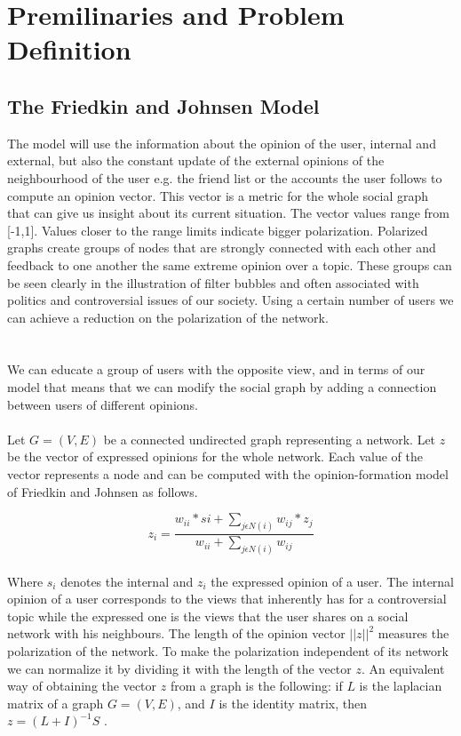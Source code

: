\chapter{Premilinaries and Problem Definition}
\label{ch:premAndDef}


\section{The Friedkin and Johnsen Model}
\label{sec:prem}

The model will use the information about the opinion of the user, internal and external, but also the constant update of the external opinions of the neighbourhood of the user e.g. the friend list or the accounts the user follows
to compute an opinion vector. This vector is a metric for the whole social graph that can give us insight about its current situation. The vector values range from [-1,1]. Values closer to the range limits indicate bigger polarization. Polarized graphs create groups of nodes that are strongly connected with each other and feedback to one another the same extreme opinion over a topic. These groups can be seen clearly in the illustration of filter bubbles and often associated with politics and controversial issues of our society. Using a certain number of users we can achieve a reduction on the polarization of the network. 
\\
\\
\\
We can educate a group of users with the opposite view, and in terms of our model that means that we can modify the social graph by adding a connection between  users of different opinions. \\
\\
Let $G = (V,E)$ be a connected undirected graph representing a network. Let $z$ be the vector of expressed opinions  for the whole network. Each value  of the vector represents a node and can be computed with the opinion-formation model of Friedkin and Johnsen as follows. 

\begin{equation} 
	z_i = \frac{w_{ii}*si + \sum_{j \epsilon N(i) }{w_{ij}*z_j}} {w_{ii} + \sum_{j \epsilon N(i) }{w_{ij}}} 
\end{equation} 
\\
Where $s_i$ denotes the internal and $z_i$ the expressed opinion of a user. The internal opinion of a user corresponds to the views that inherently has for a controversial topic while the expressed one is the views that the user shares on a social network with his neighbours. The length of the opinion vector $||z|| ^2$ measures  the polarization of the network. To make the polarization  independent of its network we can  normalize it  by dividing  it with the length of the vector $z$. 
An equivalent way of obtaining the vector $z$ from a graph is the following: if $L$ is the laplacian matrix of a graph $G=(V,E)$, and $I$ is the identity matrix, then $z=(L+I)^{-1}S$ \cite{bindel}. 

